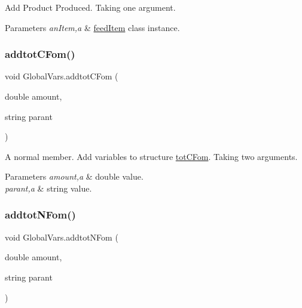 Add Product Produced. Taking one argument. 


\begin{DoxyParams}{Parameters}
{\em an\+Item,a} & \mbox{\hyperlink{classfeed_item}{feed\+Item}} class instance. \\
\hline
\end{DoxyParams}
\mbox{\label{class_global_vars_a5659ed6651b76f2d25cc6900309c2a37}} 
\subsubsection{\texorpdfstring{addtotCFom()}{addtotCFom()}}
{\footnotesize\ttfamily void Global\+Vars.\+addtot\+C\+Fom (\begin{DoxyParamCaption}\item[{double}]{amount,  }\item[{string}]{parant }\end{DoxyParamCaption})\hspace{0.3cm}{\ttfamily [inline]}}



A normal member. Add variables to structure \mbox{\hyperlink{struct_global_vars_1_1tot_c_fom}{tot\+C\+Fom}}. Taking two arguments. 


\begin{DoxyParams}{Parameters}
{\em amount,a} & double value. \\
\hline
{\em parant,a} & string value. \\
\hline
\end{DoxyParams}
\mbox{\label{class_global_vars_a33070ef9c825f07e71cab9822692abf4}} 
\subsubsection{\texorpdfstring{addtotNFom()}{addtotNFom()}}
{\footnotesize\ttfamily void Global\+Vars.\+addtot\+N\+Fom (\begin{DoxyParamCaption}\item[{double}]{amount,  }\item[{string}]{parant }\end{DoxyParamCaption})\hspace{0.3cm}{\ttfamily [inline]}}



